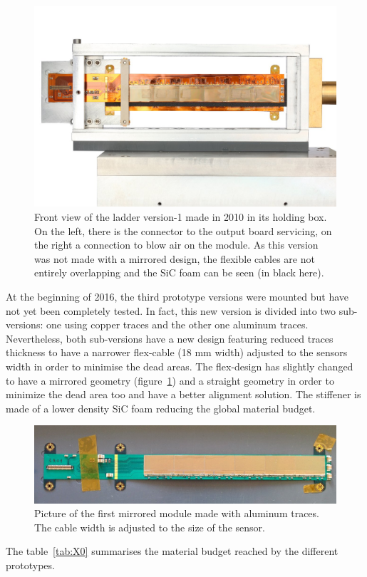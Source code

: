     \begin{figure}[!h]
      \centering
      \includegraphics[width = 12 cm]{Pictures/vxd/plume_ladder2010_frontView}
      \caption{Front view of the ladder version-1 made in 2010 in its holding box. On the left, there is the connector to the output board servicing, on the right a connection to blow air on the module. As this version was not made with a mirrored design, the flexible cables are not entirely overlapping and the SiC foam can be seen (in black here).}
    \end{figure}

    At the beginning of 2016, the third prototype versions were mounted but have not yet been completely tested.
    In fact, this new version is divided into two sub-versions: one using copper traces and the other one aluminum traces.
    Nevertheless, both sub-versions have a new design featuring reduced traces thickness to have a narrower flex-cable (18 mm width) adjusted to the sensors width in order to minimise the dead areas.
    The flex-design has slightly changed to have a mirrored geometry (figure~\ref{fig:AM01}) and a straight geometry in order to minimize the dead area too and have a better alignment solution.
    The stiffener is made of a lower density \gls{SiC} foam reducing the global material budget. 

    \begin{figure}[!h]
      \centering
      \includegraphics[width = 12cm]{Pictures/vxd/AM01.jpg}
      \caption{Picture of the first mirrored module made with aluminum traces. The cable width is adjusted to the size of the sensor.}
      \label{fig:AM01}
    \end{figure}
    The table~\ref{tab:X0} summarises the material budget reached by the different prototypes.

